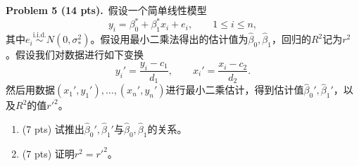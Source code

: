 \documentclass[UTF8,a4paper,11pt,fontset=fandol]{ctexart}
\newcommand{\problem}[2]{\par\addvspace{10pt}\Needspace{5\baselineskip}\textbf{Problem #1 (#2 pts).}\ }
\begin{document}
\problem{5}{14}假设一个简单线性模型
\begin{equation*}
  y_i=\beta_0^*+\beta_1^*x_i+e_i,\qquad 1\le i\le n,
\end{equation*}
其中$e_i\overset{\mathrm{i.i.d.}}{\sim}N(0,\sigma_*^2)$。假设用最小二乘法得出的估计值为$\widehat\beta_0,\widehat\beta_1$，回归的$R^2$记为$r^2$。假设我们对数据进行如下变换
\begin{equation*}
  y_i'=\frac{y_i-c_1}{d_1},\qquad x_i'=\frac{x_i-c_2}{d_2}.
\end{equation*}
然后用数据$(x_1',y_1'),\ldots,(x_n',y_n')$进行最小二乘估计，得到估计值$\widehat\beta_0',\widehat\beta_1'$，以及$R^2$的值$r'^2$。
\begin{enumerate}
  \item (7 pts) 试推出$\widehat\beta_0',\widehat\beta_1'$与$\widehat\beta_0,\widehat\beta_1$的关系。
  \item (7 pts) 证明$r^2=r'^2$。
\end{enumerate}
\end{document}
